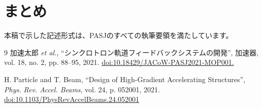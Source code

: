 \documentclass{PASJ2026}
\begin{document}
\section{まとめ}
本稿で示した記述形式は、PASJのすべての執筆要領を満たしています。

\begin{thebibliography}{9}
加速太郎 \textit{et al.}, ``シンクロトロン軌道フィードバックシステムの開発'', 加速器, vol. 18, no. 2, pp. 88--95, 2021. \url{doi:10.18429/JACoW-PASJ2021-MOP001.}

H. Particle and T. Beam, ``Design of High-Gradient Accelerating Structures'', \textit{Phys. Rev. Accel. Beams}, vol. 24, p. 052001, 2021. \url{doi:10.1103/PhysRevAccelBeams.24.052001}
\end{thebibliography}
\end{document}
